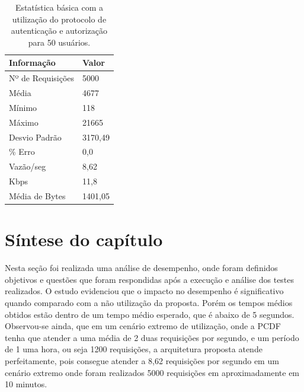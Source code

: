 \begin{table}[h]
\centering
\begin{tabular}{|l|l|}
\hline
\textbf{Informação} & \textbf{Valor} \\ \hline
Nº de Requisições   &  5000              \\ \hline
Média               &  4677             \\ \hline
Mínimo              &  118          \\ \hline
Máximo              &  21665        \\ \hline
Desvio Padrão       &  3170,49      \\ \hline
\% Erro             &  0,0          \\ \hline
Vazão/seg           &  8,62     \\ \hline
Kbps                &  11,8         \\ \hline
Média de Bytes      &  1401,05      \\ \hline
\end{tabular}
\caption {Estatística básica com a utilização do protocolo de autenticação e autorização para 50 usuários.}\label{tb:estatistica_com_cripto_50}
\end{table}

\section{Síntese do capítulo}
Nesta seção foi realizada uma análise de desempenho, onde foram definidos objetivos e questões que foram respondidas após a execução e análise dos testes realizados. O estudo evidenciou que o impacto no desempenho é significativo quando comparado com a não utilização da proposta. Porém os tempos médios obtidos estão dentro de um tempo médio esperado, que é abaixo de 5 segundos. Observou-se ainda, que em um cenário extremo de utilização, onde a PCDF tenha que atender a uma média de 2 duas requisições por segundo, e um período de 1 uma hora, ou seja 1200 requisições, a arquitetura proposta atende perfeitamente, pois consegue atender a 8,62 requisições por segundo em um cenário extremo onde foram realizados 5000 requisições em aproximadamente em 10 minutos. 